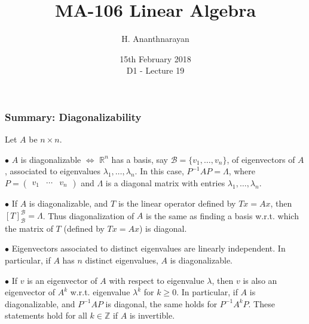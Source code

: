 \documentclass[handout]{beamer}
\newcommand{\BR}{\mbox{$\mathbb R$}}    \newcommand{\BL}{\mbox{$\mathbb L$}}
\newcommand{\BZ}{\mbox{$\mathbb Z$}}
\def\cB{\mathcal{B}}
\begin{document}
 
\title[D1 - Lecture 19]{ MA-106 Linear Algebra} 
\author{H. Ananthnarayan} 
\date[15th February 2018]{\small{15th February 2018 \\ D1 - Lecture 19}}
\frame{\titlepage}


\begin{frame}
\frametitle{Summary: Diagonalizability}
Let $A$ be $n \times n$. \pause

$\bullet$ $A$ is diagonalizable \pause $\Leftrightarrow$ $\BR^n$ has a basis\pause, say $\cB = \{v_1,\ldots, v_n\}$, of eigenvectors of $A$, \pause
associated to eigenvalues $\lambda_1,\ldots, \lambda_n$. \pause In this case, $P^{-1}AP = \Lambda$, \pause where $P = \begin{pmatrix} v_1 &  \cdots & v_n\end{pmatrix}$ \pause 
and $\Lambda$ is a diagonal matrix with entries $\lambda_1,\ldots, \lambda_n$. \pause\smallskip

$\bullet$ If $A$ is diagonalizable, and $T$ is the linear operator defined by $Tx = Ax$\pause, then $[T]_{\cB}^{\cB} = \Lambda$. \pause
Thus diagonalization of $A$ is the same as \pause finding a basis w.r.t. which the matrix of $T$ \pause (defined by $Tx = Ax$) is diagonal.\pause\smallskip

$\bullet$ Eigenvectors associated to distinct eigenvalues \pause are linearly independent. \pause In particular, if $A$ has $n$ distinct eigenvalues\pause, 
$A$ is diagonalizable. \pause \smallskip

$\bullet$ If $v$ is an eigenvector of $A$ \pause with respect to eigenvalue $\lambda$, \pause then
$v$ is also an eigenvector of $A^k$ \pause w.r.t. eigenvalue $\lambda^k$ for $k \geq 0$. \pause In particular, if $A$ is diagonalizable, \pause and $P^{-1}AP$ is diagonal, the same holds for $P^{-1}A^k P$. \pause These statements hold for all $k \in \BZ$ if $A$ is invertible.
\end{frame}
\end{document}
